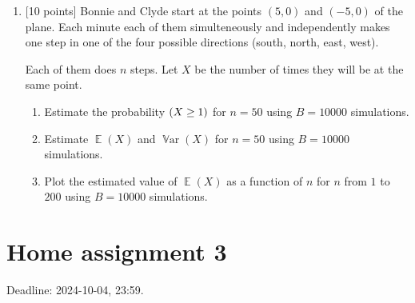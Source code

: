 \documentclass[12pt]{article}
\DeclareMathOperator{\Var}{\mathbb{V}ar}
\let\P\relax
\DeclareMathOperator{\P}{\mathbb{P}}
\DeclareMathOperator{\E}{\mathbb{E}}
\begin{document}
\begin{enumerate}
    \item {[10 points]} Bonnie and Clyde start at the points $(5, 0)$ and $(-5, 0)$ of the plane. 
    Each minute each of them simulteneously and independently makes one step in one of the four possible directions (south, north, east, west).

    Each of them does $n$ steps.
    Let $X$ be the number of times they will be at the same point.
    \begin{enumerate}
        \item Estimate the probability $\P(X \geq 1)$ for $n=50$ using $B=10000$ simulations. 
        \item Estimate $\E(X)$ and $\Var(X)$ for $n=50$ using $B=10000$ simulations. 
        \item Plot the estimated value of $\E(X)$ as a function of $n$ for $n$ from $1$ to $200$ using $B=10000$ simulations. 
    \end{enumerate}

\end{enumerate}




\section*{Home assignment 3}

Deadline: 2024-10-04, 23:59.
\end{document}
